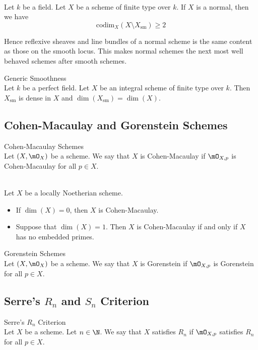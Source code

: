 \documentclass[a4paper]{article}
\begin{document}
\begin{prp}{}{}\\
Let $k$ be a field. Let $X$ be a scheme of finite type over $k$. If $X$ is a normal, then we have $$\text{codim}_X(X\setminus X_\text{sm})\geq 2$$
\end{prp}

Hence reflexive sheaves and line bundles of a normal scheme is the same content as those on the smooth locus. This makes normal schemes the next most well behaved schemes after smooth schemes. 

\begin{thm}{Generic Smoothness}{}\\
Let $k$ be a perfect field. Let $X$ be an integral scheme of finite type over $k$. Then $X_\text{sm}$ is dense in $X$ and $\dim(X_\text{sm})=\dim(X)$. 
\end{thm}

\subsection{Cohen-Macaulay and Gorenstein Schemes}
\begin{defn}{Cohen-Macaulay Schemes}{}\\
Let $(X,\mO_X)$ be a scheme. We say that $X$ is Cohen-Macaulay if $\mO_{X,p}$ is Cohen-Macaulay for all $p\in X$. 
\end{defn}

\begin{prp}{}{}\\
Let $X$ be a locally Noetherian scheme. 
\begin{itemize}
\item If $\dim(X)=0$, then $X$ is Cohen-Macaulay. 
\item Suppose that $\dim(X)=1$. Then $X$ is Cohen-Macaulay if and only if $X$ has no embedded primes. 
\end{itemize}
\end{prp}

\begin{defn}{Gorenstein Schemes}{}\\
Let $(X,\mO_X)$ be a scheme. We say that $X$ is Gorenstein if $\mO_{X,p}$ is Gorenstein for all $p\in X$. 
\end{defn}

\subsection{Serre's $R_n$ and $S_n$ Criterion}
\begin{defn}{Serre's $R_n$ Criterion}{}\\
Let $X$ be a scheme. Let $n\in\N$. We say that $X$ satisfies $R_n$ if $\mO_{X,p}$ satisfies $R_n$ for all $p\in X$. 
\end{defn}
\end{document}
